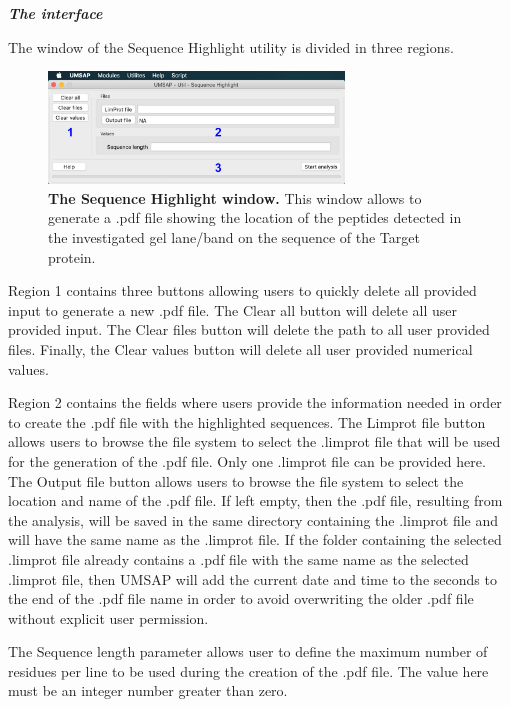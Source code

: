 \textit{\textbf{The interface}}

The window of the Sequence Highlight utility is divided in three regions. 

\begin{figure}[h]
	\centering
	\includegraphics[width=0.7\textwidth]{./IMAGES/UTIL-SEQUENCE-HIGHLIGHT/sequence-highlight.jpg}	    
	\caption[The Sequence Highlight window]{\textbf{The Sequence Highlight window.} This window allows to generate a .pdf file showing the location of the peptides detected in the investigated gel lane/band on the sequence of the Target protein.} 
	\label{fig:seqhighwindow}
	\vspace{-5pt} 	
\end{figure} 

Region \num{1} contains three buttons allowing users to quickly delete all provided input to generate a new .pdf file. The Clear all button will delete all user provided input. The Clear files button will delete the path to all user provided files. Finally, the Clear values button will delete all user provided numerical values.

Region \num{2} contains the fields where users provide the information needed in order to create the .pdf file with the highlighted sequences. The Limprot file button allows users to browse the file system to select the .limprot file that will be used for the generation of the .pdf file. Only one .limprot file can be provided here. The Output file button allows users to browse the file system to select the location and name of the .pdf file. If left empty, then the .pdf file, resulting from the analysis, will be saved in the same directory containing the .limprot file and will have the same name as the .limprot file. If the folder containing the selected .limprot file already contains a .pdf file with the same name as the selected .limprot file, then UMSAP will add the current date and time to the seconds to the end of the .pdf file name in order to avoid overwriting the older .pdf file without explicit user permission.

The Sequence length parameter allows user to define the maximum number of residues per line to be used during the creation of the .pdf file. The value here must be an integer number greater than zero.

